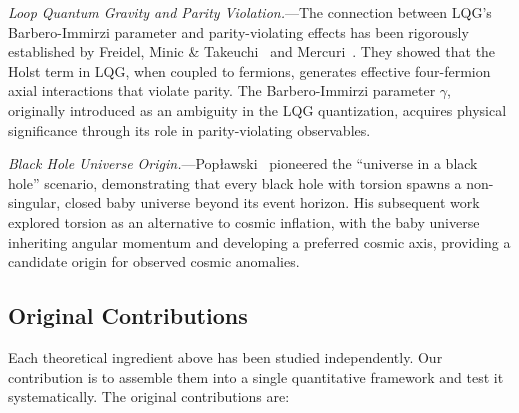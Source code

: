 \documentclass[aps,prd,twocolumn,superscriptaddress,showpacs,preprintnumbers,nofootinbib,longbibliography,floatfix]{revtex4-2}
\begin{document}
\textit{Loop Quantum Gravity and Parity Violation.}---The connection between LQG's Barbero-Immirzi parameter and parity-violating effects has been rigorously established by Freidel, Minic \& Takeuchi~\cite{Freidel2005} and Mercuri~\cite{Mercuri2006,Mercuri2009}. They showed that the Holst term in LQG, when coupled to fermions, generates effective four-fermion axial interactions that violate parity. The Barbero-Immirzi parameter $\gamma$, originally introduced as an ambiguity in the LQG quantization, acquires physical significance through its role in parity-violating observables.

\textit{Black Hole Universe Origin.}---Pop\l{}awski~\cite{Poplawski2016} pioneered the ``universe in a black hole'' scenario, demonstrating that every black hole with torsion spawns a non-singular, closed baby universe beyond its event horizon. His subsequent work~\cite{Poplawski2010} explored torsion as an alternative to cosmic inflation, with the baby universe inheriting angular momentum and developing a preferred cosmic axis, providing a candidate origin for observed cosmic anomalies.


\subsection{Original Contributions}\label{sec:contributions}

Each theoretical ingredient above has been studied independently. Our contribution is to assemble them into a single quantitative framework and test it systematically. The original contributions are:
\end{document}
